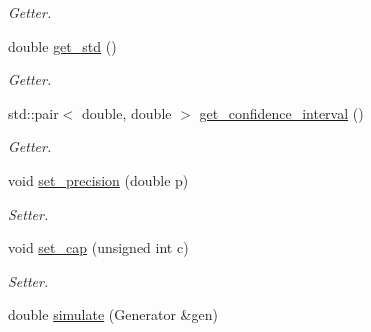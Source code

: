 \begin{DoxyCompactItemize}
\begin{DoxyCompactList}\small\item\em Getter. \end{DoxyCompactList}\item 
double \hyperlink{classmonte__carlo_afff42d06090878c287928c375e9713d2}{get\+\_\+std} ()\hypertarget{classmonte__carlo_afff42d06090878c287928c375e9713d2}{}\label{classmonte__carlo_afff42d06090878c287928c375e9713d2}

\begin{DoxyCompactList}\small\item\em Getter. \end{DoxyCompactList}\item 
std\+::pair$<$ double, double $>$ \hyperlink{classmonte__carlo_a1e83d23fdb90bc2680a2820151250c6f}{get\+\_\+confidence\+\_\+interval} ()\hypertarget{classmonte__carlo_a1e83d23fdb90bc2680a2820151250c6f}{}\label{classmonte__carlo_a1e83d23fdb90bc2680a2820151250c6f}

\begin{DoxyCompactList}\small\item\em Getter. \end{DoxyCompactList}\item 
void \hyperlink{classmonte__carlo_a4630da58a98e8f080c124b6be1239849}{set\+\_\+precision} (double p)\hypertarget{classmonte__carlo_a4630da58a98e8f080c124b6be1239849}{}\label{classmonte__carlo_a4630da58a98e8f080c124b6be1239849}

\begin{DoxyCompactList}\small\item\em Setter. \end{DoxyCompactList}\item 
void \hyperlink{classmonte__carlo_aa73333519c4f888338def6b93a125304}{set\+\_\+cap} (unsigned int c)\hypertarget{classmonte__carlo_aa73333519c4f888338def6b93a125304}{}\label{classmonte__carlo_aa73333519c4f888338def6b93a125304}

\begin{DoxyCompactList}\small\item\em Setter. \end{DoxyCompactList}\item 
double \hyperlink{classmonte__carlo_ad4dbf4b40cadbacc3beadd7fd3721d0b}{simulate} (Generator \&gen)\hypertarget{classmonte__carlo_ad4dbf4b40cadbacc3beadd7fd3721d0b}{}\label{classmonte__carlo_ad4dbf4b40cadbacc3beadd7fd3721d0b}


\end{DoxyCompactItemize}
